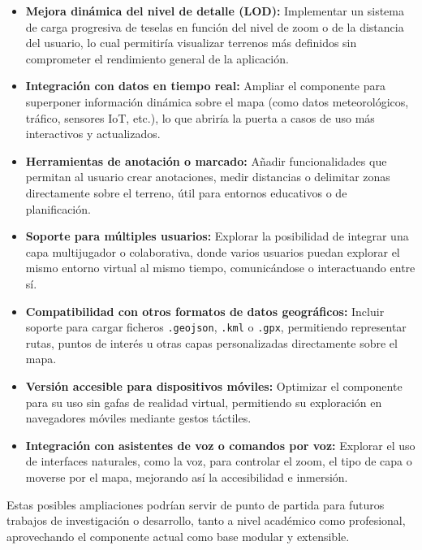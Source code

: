 \documentclass[a4paper, 12pt]{book}
\begin{document}
\begin{itemize}
  \item \textbf{Mejora dinámica del nivel de detalle (LOD):} Implementar un sistema de carga progresiva de teselas en función del nivel de zoom o de la distancia del usuario, lo cual permitiría visualizar terrenos más definidos sin comprometer el rendimiento general de la aplicación.

  \item \textbf{Integración con datos en tiempo real:} Ampliar el componente para superponer información dinámica sobre el mapa (como datos meteorológicos, tráfico, sensores IoT, etc.), lo que abriría la puerta a casos de uso más interactivos y actualizados.

  \item \textbf{Herramientas de anotación o marcado:} Añadir funcionalidades que permitan al usuario crear anotaciones, medir distancias o delimitar zonas directamente sobre el terreno, útil para entornos educativos o de planificación.

  \item \textbf{Soporte para múltiples usuarios:} Explorar la posibilidad de integrar una capa multijugador o colaborativa, donde varios usuarios puedan explorar el mismo entorno virtual al mismo tiempo, comunicándose o interactuando entre sí.

  \item \textbf{Compatibilidad con otros formatos de datos geográficos:} Incluir soporte para cargar ficheros \texttt{.geojson}, \texttt{.kml} o \texttt{.gpx}, permitiendo representar rutas, puntos de interés u otras capas personalizadas directamente sobre el mapa.

  \item \textbf{Versión accesible para dispositivos móviles:} Optimizar el componente para su uso sin gafas de realidad virtual, permitiendo su exploración en navegadores móviles mediante gestos táctiles.

  \item \textbf{Integración con asistentes de voz o comandos por voz:} Explorar el uso de interfaces naturales, como la voz, para controlar el zoom, el tipo de capa o moverse por el mapa, mejorando así la accesibilidad e inmersión.
\end{itemize}

Estas posibles ampliaciones podrían servir de punto de partida para futuros trabajos de investigación o desarrollo, tanto a nivel académico como profesional, aprovechando el componente actual como base modular y extensible.
\end{document}
